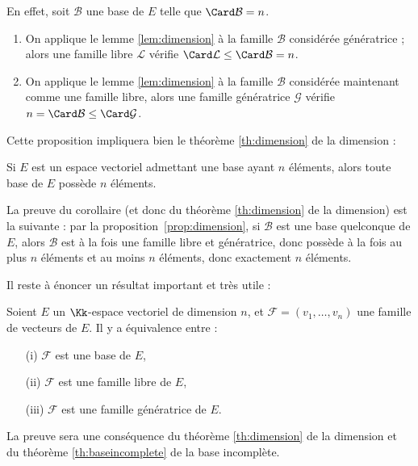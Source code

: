 \documentclass[class=report,crop=false]{standalone}
\begin{document}
En effet, soit $\mathcal{B}$ une base de $E$ telle que $\Card \mathcal{B}=n$.
\begin{enumerate}
  \item On applique le lemme \ref{lem:dimension} à la famille $\mathcal{B}$ considérée
génératrice ; alors une famille libre $\mathcal{L}$ vérifie
$\Card\mathcal{L} \le \Card \mathcal{B}=n$.

  \item On applique le lemme \ref{lem:dimension} à la famille $\mathcal{B}$ considérée
maintenant comme une famille libre, alors une famille génératrice $\mathcal{G}$ vérifie
$n=\Card\mathcal{B} \le \Card \mathcal{G}$.
\end{enumerate}


\bigskip


Cette proposition impliquera bien le théorème \ref{th:dimension} de la dimension :
\begin{corollaire}
Si $E$ est un espace vectoriel admettant une base ayant $n$ éléments,
alors toute base de $E$ possède $n$ éléments.
\end{corollaire}

La preuve du corollaire (et donc du théorème \ref{th:dimension} de la dimension) est la suivante :
par la proposition~\ref{prop:dimension}, si $\mathcal{B}$ est une base quelconque de $E$,
alors $\mathcal{B}$ est à la fois une famille libre et génératrice, donc
possède à la fois au plus $n$ éléments et au moins $n$ éléments, donc exactement
$n$ éléments.



\bigskip

Il reste à énoncer un résultat important et très utile :
\begin{theoreme}
\label{th:equivbase}
Soient $E$ un $\Kk$-espace vectoriel de dimension $n$, et
$\mathcal{F}=(v_1,\ldots,v_n)$ une famille de  vecteurs de $E$.
Il y a équivalence entre :
\begin{itemize}
  \item[(i)] $\mathcal{F}$ est une base de $E$,

  \item[(ii)] $\mathcal{F}$ est une famille libre de $E$,

  \item[(iii)] $\mathcal{F}$ est une famille génératrice de $E$.
\end{itemize}
\end{theoreme}
La preuve sera une conséquence du théorème \ref{th:dimension} de la dimension et du
théorème \ref{th:baseincomplete} de la base incomplète.
\end{document}
